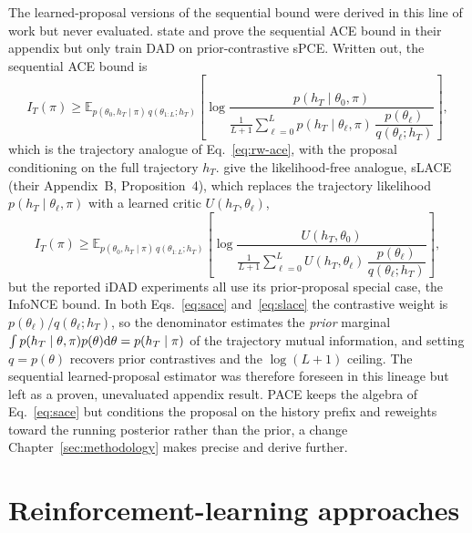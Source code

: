 The learned-proposal versions of the sequential bound were derived in this line of work but
never evaluated. \citet{foster2021deep} state and prove the sequential ACE bound in their
appendix but only train DAD on prior-contrastive sPCE. Written out, the sequential ACE bound
\citep[Theorem~5, Eq.~91]{foster2021deep} is
\begin{equation}
\label{eq:sace}
I_T(\pi) \ge \mathbb{E}_{p(\theta_0,h_T\mid\pi)\,q(\theta_{1:L};h_T)}
\!\left[\log\frac{p(h_T\mid\theta_0,\pi)}{\frac{1}{L+1}\sum_{\ell=0}^{L} p(h_T\mid\theta_\ell,\pi)\,\dfrac{p(\theta_\ell)}{q(\theta_\ell;h_T)}}\right],
\end{equation}
which is the trajectory analogue of Eq.~\eqref{eq:rw-ace}, with the proposal conditioning on the
full trajectory $h_T$. 
\citet{ivanova2021implicit} give the likelihood-free analogue, sLACE (their Appendix~B, Proposition~4), which replaces the trajectory likelihood $p(h_T\mid\theta_\ell,\pi)$ with a learned critic $U(h_T,\theta_\ell)$,
\begin{equation}
\label{eq:slace}
I_T(\pi) \ge \mathbb{E}_{p(\theta_0,h_T\mid\pi)\,q(\theta_{1:L};h_T)}
\!\left[\log\frac{U(h_T,\theta_0)}{\frac{1}{L+1}\sum_{\ell=0}^{L} U(h_T,\theta_\ell)\,\dfrac{p(\theta_\ell)}{q(\theta_\ell;h_T)}}\right],
\end{equation}
but the reported iDAD experiments all use its prior-proposal special case, the InfoNCE
bound. In both Eqs.~\eqref{eq:sace} and~\eqref{eq:slace} the contrastive weight is
$p(\theta_\ell)/q(\theta_\ell;h_T)$, so the denominator estimates the \emph{prior} marginal
$\int p(h_T\mid\theta,\pi)p(\theta)\mathrm{d}\theta=p(h_T\mid\pi)$ of the trajectory mutual
information, and setting $q=p(\theta)$ recovers prior contrastives and the $\log(L+1)$
ceiling. The sequential learned-proposal estimator was therefore foreseen in this lineage
but left as a proven, unevaluated appendix result. PACE keeps the algebra of
Eq.~\eqref{eq:sace} but conditions the proposal on the history prefix and reweights toward
the running posterior rather than the prior, a change Chapter~\ref{sec:methodology} makes
precise and derive further.

\section{Reinforcement-learning approaches}
\label{sec:rw-rl}


